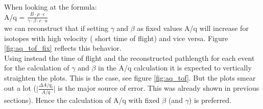 \documentclass[12pt, letterpaper]{article}
\begin{document}
When looking at the formula:\\
A/q = $\frac{B \cdot \rho \cdot e}{\gamma\cdot\beta \cdot c \cdot u}$ \\
we can reconstruct that if setting $\gamma$ and $\beta$ as fixed values A/q will increase for isotopes with high velocity ( short time of flight) and vice versa. Figure \ref{fig:aq_tof_fix} reflects this behavior.\\
Using instead the time of flight and the reconstructed pathlength for each event for the calculation of $\gamma$ and $\beta$ in the A/q calculation it is expected to vertically straighten the plots. This is the case, see figure \ref{fig:aq_tof}. But the plots smear out a lot ($\big|\frac{\Delta A/q_{t}}{A/q}\big|$ is the major source of error. This was already shown in previous sections). Hence the calculation of A/q with fixed $\beta$ (and $\gamma$) is preferred. 
\newpage
\end{document}
